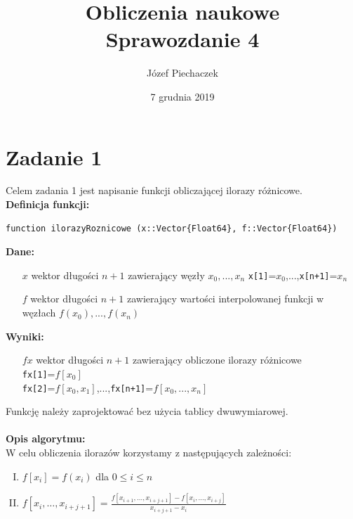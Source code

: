 \documentclass[12pt]{article}
\title{
	Obliczenia naukowe \\
	Sprawozdanie 4
}
\date{7 grudnia 2019}
\author{Józef Piechaczek}
\begin{document}
\maketitle
\newpage
{}

\setlength{\abovedisplayskip}{5pt}
\setlength{\belowdisplayskip}{5pt}

\section{Zadanie 1}
Celem zadania 1 jest napisanie funkcji obliczającej ilorazy różnicowe.\\
\textbf{Definicja funkcji:}

\begin{verbatim}
function ilorazyRoznicowe (x::Vector{Float64}, f::Vector{Float64})
\end{verbatim}
\textbf{Dane:}
\begin{itemize}[leftmargin=4.0cm,labelsep=0.4cm]
\item[$x$] wektor długości $n + 1$ zawierający węzły $x_0, ..., x_n$ \texttt{x[1]}=$x_0$,...,\texttt{x[n+1]}=$x_n$
\item[$f$] wektor długości $n+1$ zawierający wartości interpolowanej funkcji w węzłach $f(x_0),...,f(x_n)$
\end{itemize}
\textbf{Wyniki:} 
\begin{itemize}[leftmargin=4.0cm,labelsep=0.4cm]
\item[$fx$] wektor długości $n+1$ zawierający obliczone ilorazy różnicowe \\
\texttt{fx[1]}=$f[x_0]$\\
\texttt{fx[2]}=$f[x_0, x_1]$,...,\texttt{fx[n+1]}=$f[x_0,...,x_n]$
\end{itemize}

\noindent Funkcję należy zaprojektować bez użycia tablicy dwuwymiarowej.
\\
\\
\noindent \textbf{Opis algorytmu:}\\
W celu obliczenia ilorazów korzystamy z następujących zależności:
\begin{enumerate}[I.]
\item $f[x_i]=f(x_i)$ dla $0 \leq i \leq n$
\item $f[x_i, \ldots , x_{i+j+1}] = \frac{f[x_{i+1}, \ldots , x_{i+j+1}] - f[x_i, \ldots , x_{i+j}]}{x_{i+j+1}-x_i}$
\end{enumerate}
\end{document}
